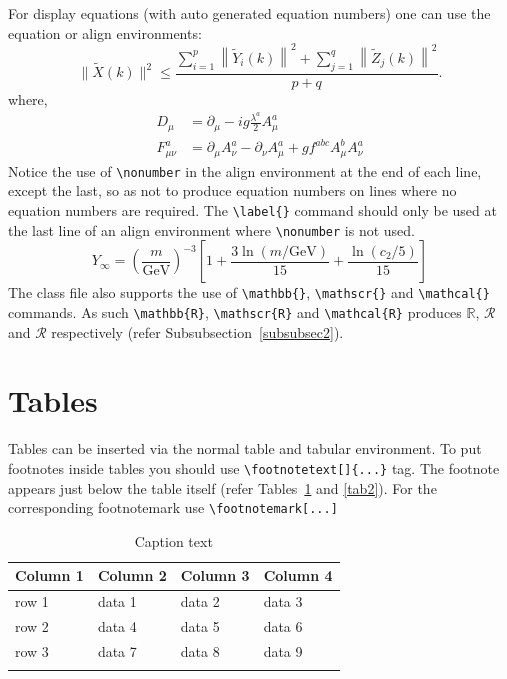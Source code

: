 \documentclass[pdflatex,sn-mathphys-num]{sn-jnl}%
\theoremstyle{thmstyleone}%
\theoremstyle{thmstyletwo}%
\theoremstyle{thmstylethree}%
\begin{document}
For display equations (with auto generated equation numbers)
one can use the equation or align environments:
\begin{equation}
\|\tilde{X}(k)\|^2 \leq\frac{\sum\limits_{i=1}^{p}\left\|\tilde{Y}_i(k)\right\|^2+\sum\limits_{j=1}^{q}\left\|\tilde{Z}_j(k)\right\|^2 }{p+q}.\label{eq1}
\end{equation}
where,
\begin{align}
D_\mu &=  \partial_\mu - ig \frac{\lambda^a}{2} A^a_\mu \nonumber \\
F^a_{\mu\nu} &= \partial_\mu A^a_\nu - \partial_\nu A^a_\mu + g f^{abc} A^b_\mu A^a_\nu \label{eq2}
\end{align}
Notice the use of \verb+\nonumber+ in the align environment at the end
of each line, except the last, so as not to produce equation numbers on
lines where no equation numbers are required. The \verb+\label{}+ command
should only be used at the last line of an align environment where
\verb+\nonumber+ is not used.
\begin{equation}
Y_\infty = \left( \frac{m}{\textrm{GeV}} \right)^{-3}
    \left[ 1 + \frac{3 \ln(m/\textrm{GeV})}{15}
    + \frac{\ln(c_2/5)}{15} \right]
\end{equation}
The class file also supports the use of \verb+\mathbb{}+, \verb+\mathscr{}+ and
\verb+\mathcal{}+ commands. As such \verb+\mathbb{R}+, \verb+\mathscr{R}+
and \verb+\mathcal{R}+ produces $\mathbb{R}$, $\mathscr{R}$ and $\mathcal{R}$
respectively (refer Subsubsection~\ref{subsubsec2}).

\section{Tables}\label{sec5}

Tables can be inserted via the normal table and tabular environment. To put
footnotes inside tables you should use \verb+\footnotetext[]{...}+ tag.
The footnote appears just below the table itself (refer Tables~\ref{tab1} and \ref{tab2}). 
For the corresponding footnotemark use \verb+\footnotemark[...]+

\begin{table}[h]
\caption{Caption text}\label{tab1}%
\begin{tabular}{@{}llll@{}}
\toprule
Column 1 & Column 2  & Column 3 & Column 4\\
\midrule
row 1    & data 1   & data 2  & data 3  \\
row 2    & data 4   & data 5\footnotemark[1]  & data 6  \\
row 3    & data 7   & data 8  & data 9\footnotemark[2]  \\
\botrule
\end{tabular}
\end{table}
\end{document}
